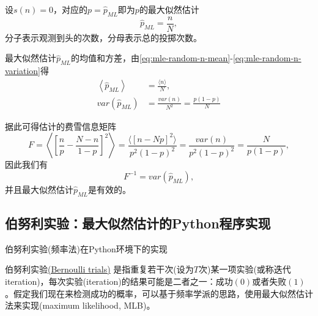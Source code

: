 设$s(n)=0$，对应的$p=\hat{p}_{ML}$即为$p$的最大似然估计
\begin{equation}
  \label{eq:mle-bernoulli-estimate}
  \hat{p}_{ML} = \frac{n}{N},
\end{equation}
分子表示观测到头的次数，分母表示总的投掷次数。

最大似然估计$\hat{p}_{ML}$的均值和方差，由\eqref{eq:mle-random-n-mean}-\eqref{eq:mle-random-n-variation}得
\begin{align}
  \label{eq:mle-bernoulli-estimate-mean}
  \left\langle \hat{p}_{ML} \right\rangle &= \frac{\langle n \rangle}{N}, \\
  var \left( \hat{p}_{ML} \right) & = \frac{var (n)}{N^{2}} = \frac{p (1-p)}{N }
\end{align}

据此可得估计的费雪信息矩阵
\begin{equation}
  \label{eq:mle-bernoulli-eistimate-information}
  F = \left\langle
  \left[
  \frac{n}{p} - \frac{N-n}{1-p}
  \right]^{2}
  \right\rangle
  = \frac{
  \langle
  \left[ n - Np \right]^{2}
  \rangle
  }{
  p^{2} \left( 1 - p \right)^{2}
  }
  = \frac{var (n)}{p^{2} \left(1-p \right)^{2}}
  = \frac{N}{p \left( 1 - p \right)},
\end{equation}
因此我们有
\begin{equation}
  \label{eq:mle-estimate-fisher-var}
  F^{-1} = var \left( \hat{p}_{ML} \right),
\end{equation}
并且最大似然估计$\hat{p}_{ML}$是有效的。

\subsection{伯努利实验：最大似然估计的Python程序实现}
\label{sec:mle-bernoulli-python}
伯努利实验(频率法)在Python环境下的实现

伯努利实验\href{https://en.wikipedia.org/wiki/Bernoulli_trial}{(Bernoulli
trials)}
是指重复若干次(设为\(T\)次)某一项实验(或称迭代iteration)，每次实验(iteration)的结果可能是二者之一：成功\((0)\)或者失败\((1)\)。假定我们现在来检测成功的概率，可以基于频率学派的思路，使用最大似然估计法来实现(maximum
likelihood, MLB)。

